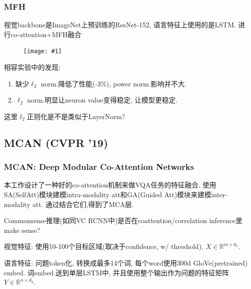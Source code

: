 \documentclass{beamer}
\newcommand{\cfig}[2]{
    \begin{figure}[htbp]
    \centering
    \texttt{[image: \#1]}
\end{figure}
}
\newenvironment{remark}[1][Remark]{\begin{trivlist}
    \item[\hskip \labelsep {\bfseries #1}]}{\end{trivlist}}
\begin{document}
\begin{frame}
    \frametitle{MFH}

    视觉backbone是ImageNet上预训练的ResNet-152, 语言特征上使用的是LSTM. 进行co-attention+MFH融合

    \cfig{vqa-fullarch.png}{0.8}

    相容实验中的发现:\begin{enumerate}
        \item 缺少$\ell_2$ norm.降低了性能(-3\%), power norm.影响并不大.
        \item $\ell_2$ norm.明显让neuron value变得稳定, 让模型更稳定.
    \end{enumerate}

    \begin{remark}
        这里$\ell_2$正则化是不是类似于LayerNorm?
    \end{remark}

\end{frame}

\subsection{MCAN (CVPR '19)}

\begin{frame}
    \frametitle{MCAN: Deep Modular Co-Attention Networks}

    本工作设计了一种好的co-attention机制来做VQA任务的特征融合. 使用SA(SelfAtt)模块建模intra-modality att和GA(Guided Att)模块来建模inter-modality att. 通过结合它们,得到了MCA层.

    \begin{remark}
        Commonsense推理(如同VC RCNN中)是否在coattention/correlation inference里make sense?
    \end{remark}

    视觉特征: 使用10-100个目标区域(取决于confidence, w/ threshold), $X \in \mathbb{R}^{m \times d_{x}}$. 

    语言特征: 问题token化, 转换成最多14个词, 每个word使用300d GloVe(pretrained) embed. 词embed.送到单层LSTM中, 并且使用整个输出作为问题的特征矩阵$Y \in \mathbb{R}^{n \times d_{y}}$.
\end{frame}
\end{document}
